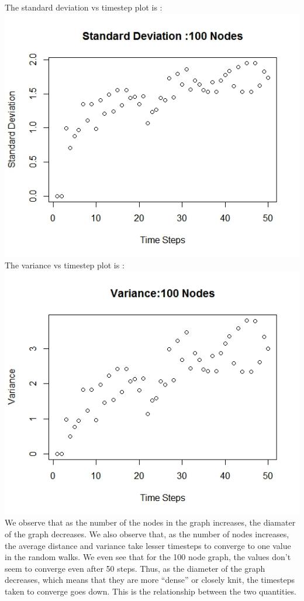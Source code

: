 \documentclass{article}
\begin{document}
The standard deviation vs timestep plot is :\\
\includegraphics[scale=0.4]{p1f} \\
The variance vs timestep plot is :\\
\includegraphics[scale=0.4]{p1e} \\

We observe that as the number of the nodes in the graph increases, the diamater of the graph decreases.
We also observe that, as the number of nodes increases, the average distance and variance take lesser timesteps to 
converge to one value in the random walks. We even see that for the 100 node graph, the values don't seem to
converge even after 50 steps. Thus, as the diameter of the graph decreases, which means that they are 
more ``dense'' or closely knit, the timesteps taken to converge goes down. This is the relationship between the two
quantities.
\end{document}
